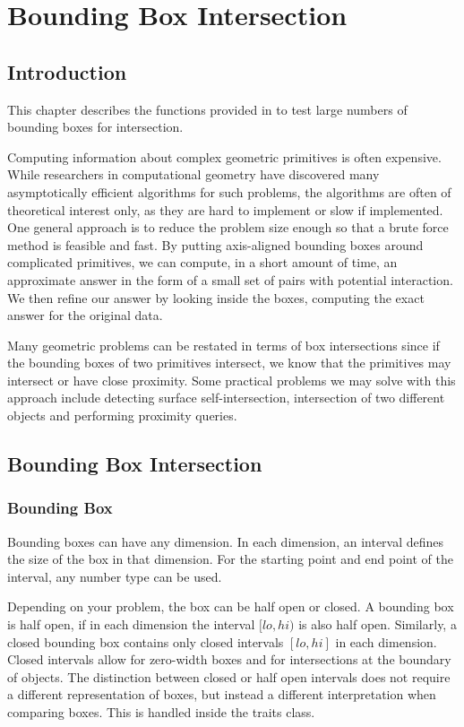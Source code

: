 \chapter*{Bounding Box Intersection}

\section*{Introduction}
This chapter describes the functions provided in \cgal{}
to test large numbers of bounding boxes for intersection.

Computing information about complex geometric primitives is often
expensive. While researchers in computational geometry have discovered
many asymptotically efficient algorithms for such problems, the
algorithms are often of theoretical interest only, as they are hard to
implement or slow if implemented. One general approach is to reduce
the problem size enough so that a brute force method is feasible and
fast. By putting axis-aligned bounding boxes around complicated
primitives, we can compute, in a short amount of time, an approximate
answer in the form of a small set of pairs with potential interaction.
We then refine our answer by looking inside the boxes, computing the
exact answer for the original data.

Many geometric problems can be restated in terms of box intersections
since if the bounding boxes of two primitives intersect, we know that
the primitives may intersect or have close proximity. Some practical
problems we may solve with this approach include detecting surface
self-intersection, intersection of two different objects and
performing proximity queries.


\section*{Bounding Box Intersection}
\subsection*{Bounding Box}

Bounding boxes can have any dimension. In each dimension, an interval
defines the size of the box in that dimension. For the starting point
and end point of the interval, any number type can be used.

Depending on your problem, the box can be half open or closed. A
bounding box is half open, if in each dimension the interval $[lo,hi)$
is also half open. Similarly, a closed bounding box contains only
closed intervals $[lo,hi]$ in each dimension. Closed intervals allow
for zero-width boxes and for intersections at the boundary of objects.
The distinction between closed or half open intervals does not require
a different representation of boxes, but instead a different
interpretation when comparing boxes. This is handled inside the traits
class.

